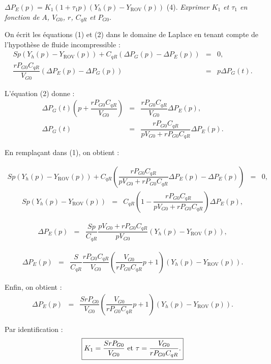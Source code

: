 $\Delta P_E(p) = K_1(1+\tau_1 p)(Y_h(p)-Y_{\text{ROV}}(p))$ (4).
\textit{Exprimer $K_1$ et $\tau_1$ en fonction de $A$, $V_{G0}$, $r$, $C_{qR}$ et $P_{G0}$.}
\ifprof
\begin{corrige}
On écrit les équations (1) et (2) dans le domaine de Laplace en tenant compte de l'hypothèse de fluide incompressible :
 \begin{eqnarray}
{Sp}\left( Y_h(p)-  Y_{\text{ROV}}(p)\right)+C_{qR}\left(\Delta P_G(p)-\Delta P_E(p)\right) &=&0, \\
\dfrac{rP_{G0}C_{qR}}{V_{G0}}\left(\Delta P_E(p)-\Delta P_G(p)\right) &=&p \Delta P_G(t).
\end{eqnarray}

L'équation (2) donne :
 \begin{eqnarray}
\Delta P_G(t)\left(p+\dfrac{rP_{G0}C_{qR}}{V_{G0}}\right)&=&\dfrac{rP_{G0}C_{qR}}{V_{G0}}\Delta P_E(p), \nonumber \\
\Delta P_G(t)&=&\dfrac{rP_{G0}C_{qR}}{pV_{G0}+{rP_{G0}C_{qR}}}\Delta P_E(p).\nonumber
\end{eqnarray}

En remplaçant dans (1), on obtient : 

 \begin{eqnarray}
{Sp}\left( Y_h(p)-  Y_{\text{ROV}}(p)\right)+C_{qR}\left(\dfrac{rP_{G0}C_{qR}}{pV_{G0}+{rP_{G0}C_{qR}}}\Delta P_E(p)-\Delta P_E(p)\right) &=&0, \nonumber
\end{eqnarray}
 \begin{eqnarray}
{Sp}\left( Y_h(p)-  Y_{\text{ROV}}(p)\right)&=&C_{qR}\left(1-\dfrac{rP_{G0}C_{qR}}{pV_{G0}+{rP_{G0}C_{qR}}}\right) \Delta P_E(p), \nonumber
\end{eqnarray}

 \begin{eqnarray}
\Delta P_E(p)&=&\dfrac{Sp}{C_{qR}}\dfrac{pV_{G0}+{rP_{G0}C_{qR}}}{pV_{G0} }\left( Y_h(p)-  Y_{\text{ROV}}(p)\right), \nonumber
\end{eqnarray}


 \begin{eqnarray}
\Delta P_E(p)&=&\dfrac{S}{C_{qR}}\dfrac{{rP_{G0}C_{qR}}}{V_{G0} }\left(\dfrac{V_{G0}}{{rP_{G0}C_{qR}} }p+1\right)\left( Y_h(p)-  Y_{\text{ROV}}(p)\right). \nonumber
\end{eqnarray}

Enfin, on obtient :
\begin{eqnarray}
\Delta P_E(p)&=&\dfrac{{SrP_{G0}}}{V_{G0} }\left(\dfrac{V_{G0}}{{rP_{G0}C_{qR}} }p+1\right)\left( Y_h(p)-  Y_{\text{ROV}}(p)\right). \nonumber
\end{eqnarray}


Par identification :
$$\boxed{K_1=\dfrac{SrP_{G0}}{V_{G0}}$ et $\tau=\dfrac{V_{G0}}{rP_{G0}C_{qR}}.}$$

\end{corrige}
\else
\fi


